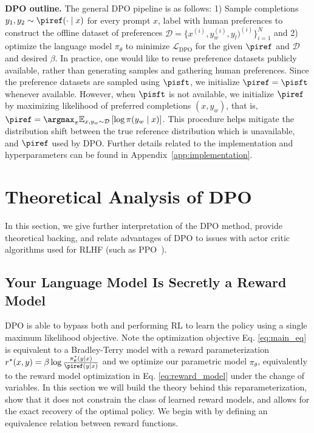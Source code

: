 \textbf{DPO outline.} 
The general DPO pipeline is as follows: 1) Sample completions $y_1, y_2 \sim \piref(\cdot \mid x)$ for every prompt $x$, label with human preferences to construct the offline dataset of preferences $\mathcal{D} = \{x^{(i)}, y_w^{(i)}, y_l)^{(i)}\}_{i=1}^N$ and 2) optimize the language model $\pi_\theta$ to minimize $\mathcal{L}_\text{DPO}$ for the given $\piref$ and $\mathcal{D}$ and desired $\beta$. 
In practice, one would like to reuse preference datasets publicly available, rather than generating samples and gathering human preferences. Since the preference datasets are sampled using $\pisft$, we initialize $\piref = \pisft$ whenever available. However, when $\pisft$ is not available, we initialize $\piref$ by maximizing likelihood of preferred completions ${(x, y_w)}$, that is, ${\piref = \argmax_{\pi}\mathbb{E}_{x, y_w \sim \mathcal{D}}\left[\log \pi(y_w \mid x)\right]}$. This procedure helps mitigate the distribution shift between the true reference distribution which is unavailable, and $\piref$ used by DPO. Further details related to the implementation and hyperparameters can be found in Appendix~\ref{app:implementation}.



\section{Theoretical Analysis of DPO}
In this section, we give further interpretation of the DPO method, provide theoretical backing, and relate advantages of DPO to issues with actor critic algorithms used for RLHF (such as PPO~\cite{schulman2017proximal}).

\label{sec:theory}

\subsection{Your Language Model Is Secretly a Reward Model} DPO is able to bypass both  and performing RL to learn the policy using a single maximum likelihood objective. Note the optimization objective Eq. \ref{eq:main_eq} is equivalent to a Bradley-Terry model with a reward parameterization $r^*(x, y) = \beta \log\frac{\pi^*_\theta(y \mid x)}{\piref(y \mid x)}$ and we optimize our parametric model $\pi_{\theta}$, equivalently to the reward model optimization in Eq. \ref{eq:reward_model} under the change of variables. In this section we will build the theory behind this reparameterization, show that it does not constrain the class of learned reward models, and allows for the exact recovery of the optimal policy. We begin with by defining an equivalence relation between reward functions. 

